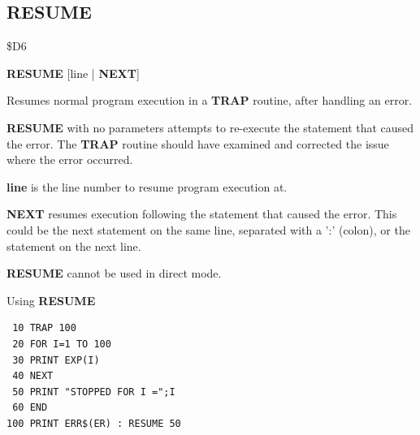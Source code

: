 
\newpage
\subsection{RESUME}
\begin{description}[leftmargin=2cm,style=nextline]
\item [Token:]    \$D6

\item [Format:]   {\bf RESUME} [line | {\bf NEXT}]

\item [Usage:]    Resumes normal program execution in a {\bf TRAP} routine, after handling an error.

                  {\bf RESUME} with no parameters attempts to re-execute the statement that caused the error. The {\bf TRAP} routine should have examined and corrected the issue where the error occurred.

                  {\bf line} is the line number to resume program execution at.

                  {\bf NEXT} resumes execution following the statement that caused the error. This could be the next statement on the same line, separated with a ':' (colon), or the statement on the next line.

\item [Remarks:]  {\bf RESUME} cannot be used in direct mode.

\item [Example:]  Using {\bf RESUME}

\begin{tcolorbox}[colback=black,coltext=white]
\verbatimfont{\codefont}
\begin{verbatim}
 10 TRAP 100
 20 FOR I=1 TO 100
 30 PRINT EXP(I)
 40 NEXT
 50 PRINT "STOPPED FOR I =";I
 60 END
100 PRINT ERR$(ER) : RESUME 50
\end{verbatim}
\end{tcolorbox}
\end{description}


\newpage
